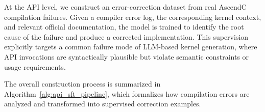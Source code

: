 



At the API level, we construct an error-correction dataset from real AscendC compilation failures. Given a compiler error log, the corresponding kernel context, and relevant official documentation, the model is trained to identify the root cause of the failure and produce a corrected implementation. This supervision explicitly targets a common failure mode of LLM-based kernel generation, where API invocations are syntactically plausible but violate semantic constraints or usage requirements.

The overall construction process is summarized in Algorithm~\ref{alg:api_sft_pipeline}, which formalizes how compilation errors are analyzed and transformed into supervised correction examples.

